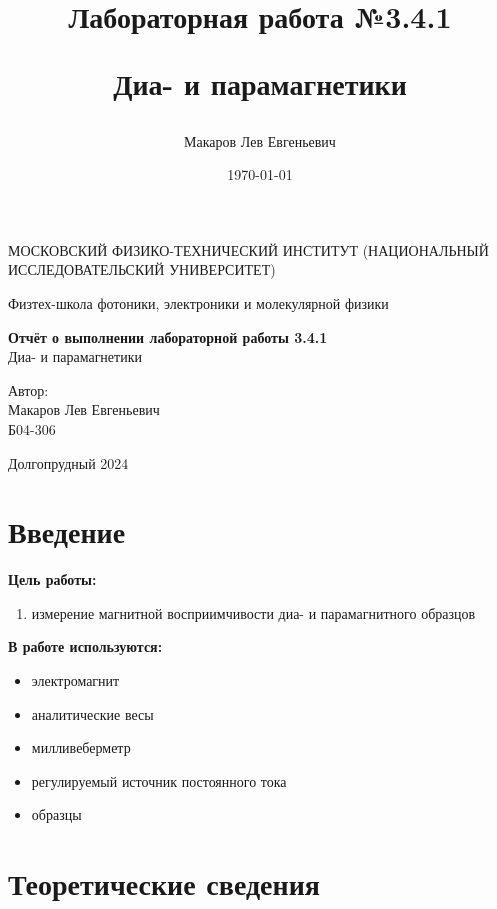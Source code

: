 \documentclass[a4paper,12pt]{article}
\author{Макаров Лев Евгеньевич}
\title{Лабораторная работа №3.4.1

Диа- и парамагнетики
}
\date{\today}
\begin{document}
\begin{titlepage}
	\begin{center}
		{\large МОСКОВСКИЙ ФИЗИКО-ТЕХНИЧЕСКИЙ ИНСТИТУТ (НАЦИОНАЛЬНЫЙ ИССЛЕДОВАТЕЛЬСКИЙ УНИВЕРСИТЕТ)}
	\end{center}
	\begin{center}
		{\large Физтех-школа фотоники, электроники и молекулярной физики}
	\end{center}
	
	
	\vspace{4.5cm}
	{\huge
		\begin{center}
			{\bf Отчёт о выполнении лабораторной работы 3.4.1}\\
			Диа- и парамагнетики
		\end{center}
	}
	\vspace{2cm}
	\begin{flushright}
		{\LARGE Автор:\\ Макаров Лев Евгеньевич \\
			\vspace{0.2cm}
			Б04-306}
	\end{flushright}
	\vspace{8cm}
	\begin{center}
		Долгопрудный 2024
	\end{center}
\end{titlepage}

\section{Введение}

\textbf{Цель работы:} 
\begin{enumerate}
	\item измерение магнитной восприимчивости диа- и парамагнитного образцов
\end{enumerate}

\textbf{В работе используются:} 
\begin{itemize}
    \item электромагнит
    \item аналитические весы
    \item милливеберметр
    \item регулируемый источник постоянного тока
    \item образцы
\end{itemize}
\medskip

\section{Теоретические сведения}
\end{document}

